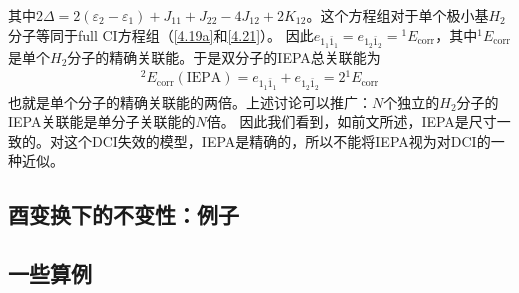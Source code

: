 \addtocounter{equation}{1}
其中$2\Delta=2(\varepsilon_2-\varepsilon_1)+J_{11}+J_{22}-4J_{12}+2K_{12}$。这个方程组对于单个极小基$H_2$分子等同于full CI方程组（\autoref{4.19a}和\autoref{4.21}）。
因此$e_{1_1\bar{1}_1}=e_{1_2\bar{1}_2}={}^1E_\text{corr}$，其中${}^1E_\text{corr}$是单个$H_2$分子的精确关联能。于是双分子的IEPA总关联能为
\begin{align}
    {}^2E_\text{corr}(\text{IEPA})=e_{1_1\bar{1}_1}+e_{1_2\bar{1}_2}=2{}^1E_\text{corr}
\end{align}
也就是单个分子的精确关联能的两倍。上述讨论可以推广：$N$个独立的$H_2$分子的IEPA关联能是单分子关联能的$N$倍。
因此我们看到，如前文所述，IEPA是尺寸一致的。对这个DCI失效的模型，IEPA是精确的，所以不能将IEPA视为对DCI的一种近似。

\subsection{酉变换下的不变性：例子}
\subsection{一些算例}

